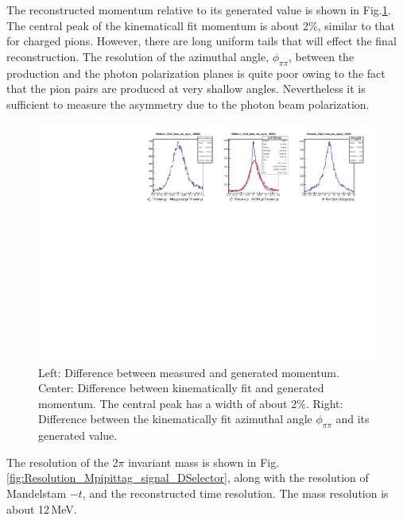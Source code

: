 The reconstructed momentum relative to its generated value is shown in
Fig.\ref{fig:DeltapDeltaPhi_signal_DSelector}. The central peak of the
kinematicall fit momentum is about 2\%, similar to that for charged
pions. However, there are long uniform tails that will effect the
final reconstruction. The resolution of the azimuthal angle,
$\phi_{\pi\pi}$, between the production and the photon polarization
planes is quite poor owing to the fact that the pion pairs are
produced at very shallow angles. Nevertheless it is sufficient to
measure the asymmetry due to the photon beam polarization.
\begin{figure}[tph]
\centering
\includegraphics[width=6in]{figures/DeltapDeltaPhi_signal_DSelector.pdf}
\caption{Left: Difference between measured and generated momentum. Center: Difference between kinematically fit and generated momentum. The central peak has a width of about 2\%. Right: Difference between the kinematically fit azimuthal angle $\phi_{\pi\pi}$ and its generated value.
\label{fig:DeltapDeltaPhi_signal_DSelector}}
\end{figure}
The resolution of the 2$\pi$ invariant mass is shown in Fig.\,\ref{fig:Resolution_Mpipittag_signal_DSelector}, along with the resolution of Mandelstam $-t$, and the reconstructed time resolution. The mass resolution is about 12\,MeV.
